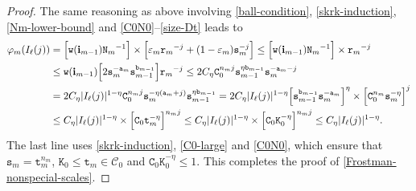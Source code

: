 \documentclass[12pt, twoside]{article}
\theoremstyle{definition}
\numberwithin{equation}{section}
\begin{document}
\begin{proof}
	The same reasoning as above involving \eqref{ball-condition}, \eqref{skrk-induction}, \eqref{Nm-lower-bound} and \eqref{C0N0}--\eqref{size-Dt} leads to 
	\begin{align*} 
		\varphi_m(I_{\ell}(j)) &= \Bigl[{\mathtt w(\mathbf i_{m-1})}{\mathtt N_m}^{-1} \Bigr] \times \Bigl[ \varepsilon_m {\mathtt r_m}^{-j} + (1 - \varepsilon_m) \mathtt s_m^{-j} \Bigr] \leq \Bigl[{\mathtt w(\mathbf i_{m-1})}{\mathtt N_m}^{-1} \Bigr] \times {\mathtt r_m}^{-j}\\ &\leq {\mathtt w(\mathbf i_{m-1})}\Bigl[2{\mathtt s_m^{-\mathtt a_m}} \mathtt s_{m-1}^{\mathtt b_{m-1}} \Bigr] {\mathtt r_m}^{-j} \leq 2C_{\eta} \mathtt C_0^{n_m j} \mathtt s_{m-1}^{\eta \mathtt b_{m-1}} \mathtt s_m^{-\mathtt a_m-j} \\ &= 2C_{\eta} |I_{\ell}(j)|^{1 - \eta} \mathtt C_0^{n_m j} \mathtt s_m^{-\eta(\mathtt a_m +j)} \mathtt s_{m-1}^{\eta \mathtt b_{m-1}} = 2C_{\eta} |I_{\ell}(j)|^{1 - \eta} \Bigl[\mathtt s_{m-1}^{\mathtt b_{m-1}} \mathtt s_m^{-\mathtt a_m}\Bigr]^{\eta} \times \Bigl[ \mathtt C_0^{n_m} \mathtt s_m^{-\eta}\Bigr]^j  \\ 
		&\leq C_{\eta}  |I_{\ell}(j)|^{1 - \eta}  \times \Bigl[ \mathtt C_0 \mathtt t_m^{-\eta}\Bigr]^{n_m j} \leq C_{\eta}  |I_{\ell}(j)|^{1 - \eta}  \times \Bigl[ \mathtt C_0 \mathtt K_0^{-\eta}\Bigr]^{n_m j}
		\leq C_{\eta} |I_{\ell}(j)|^{1 - \eta}.
	\end{align*} 
	The last line uses \eqref{skrk-induction}, \eqref{C0-large} and \eqref{C0N0}, which ensure that $\mathtt s_m = \mathtt t_m^{n_m}$, $\mathtt K_0 \le \mathtt t_m \in \mathscr{C}_0$ and $\mathtt C_0 \mathtt K_0^{-\eta} \le 1$. This completes the proof of \eqref{Frostman-nonspecial-scales}. 
\end{proof}

 
\end{document}
